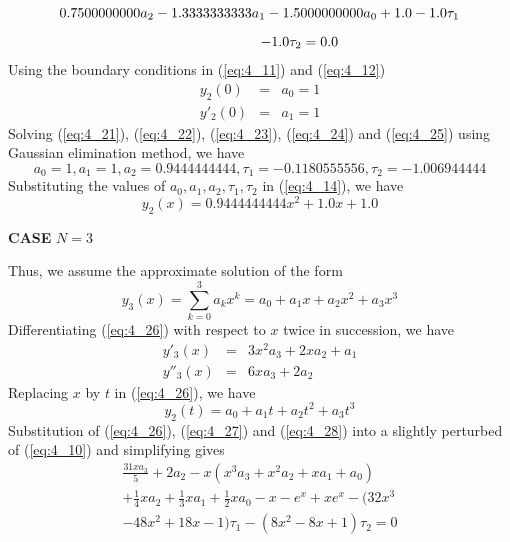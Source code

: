 \documentclass[12pt]{report}
\newcommand{\sps}{\\[0.2cm]}
\newcommand{\refn}[1]{(\ref{#1})}
\newcommand{\refx}[1]{\refn{eq:#1}}
\newcommand{\bt}[1]{\textbf{#1}}
\newcommand{\sprime}{'}
\newcommand{\dprime}{''}
\newcommand{\dsp}{\displaystyle}
\begin{document}
	\begin{eqnarray}
		0.7500000000a_2 - 1.3333333333a_1 - 1.5000000000a_0 + 1.0-1.0\tau_1 \notag\sps
		- 1.0\tau_2 = 0.0~~~~~~~~~~~~~~~~~~~~~~~~~~ \label{eq:4_23}
	\end{eqnarray}
	Using the boundary conditions in \refx{4_11} and \refx{4_12}
	\begin{eqnarray}
		y_2(0) &=& a_0 = 1\label{eq:4_24}\sps
		y\sprime_2(0) &=& a_1 =1 \label{eq:4_25}
	\end{eqnarray}
	Solving \refx{4_21}, \refx{4_22}, \refx{4_23}, \refx{4_24} and \refx{4_25} using Gaussian elimination method, we have
	\begin{equation*}
		a_0=1, a_1=1, a_2=0.9444444444, \tau_1=-0.1180555556, \tau_2=-1.006944444
	\end{equation*}
	Substituting the values of $a_0, a_1, a_2, \tau_1, \tau_2$ in \refx{4_14}, we have
	\begin{equation*}
		y_2(x) = 0.9444444444x^2 + 1.0x + 1.0
	\end{equation*}
	\newpage
	\begin{center}
		\large \bt{CASE} $N=3$
	\end{center}
	Thus, we assume the approximate solution of the form
	\begin{equation}
		y_3(x) = \sum_{k=0}^{3}a_kx^k = a_0 + a_1x + a_2x^2 + a_3x^3 \label{eq:4_26}
	\end{equation}
	Differentiating \refx{4_26} with respect to $x$ twice in succession, we have
	\begin{eqnarray}
		y\sprime_3(x) &=& 3x^2a_3 + 2xa_2 + a_1 \label{eq:4_27}\sps
		y\dprime_3(x) &=& 6xa_3 + 2a_2 \label{eq:4_28}
	\end{eqnarray}	
	Replacing $x$ by $t$ in \refx{4_26}, we have
	\begin{equation}
		y_2(t) = a_0 + a_1t +a_2t^2 + a_3t^3 \label{eq:4_29}
	\end{equation}
	Substitution of \refx{4_26}, \refx{4_27} and \refx{4_28} into a slightly perturbed of \refx{4_10} and simplifying gives
	\begin{equation}
		\begin{array}{l}
			\dsp \frac{31xa_3}{5} + 2a_2 -x(x^3a_3 + x^2a_2 + xa_1 + a_0)\\
			+\frac{1}{4}xa_2 + \frac{1}{3}xa_1 + \frac{1}{2}xa_0 - x - e^x + xe^x-(32x^3\\
			-48x^2 + 18x - 1)\tau_1 - (8x^2 - 8x + 1)\tau_2 = 0
		\end{array}
		\label{eq:4_30}
	\end{equation}
\end{document}
